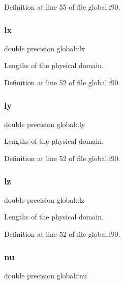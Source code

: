 Definition at line 55 of file global.\+f90.

\mbox{\label{namespaceglobal_ac5d2ea39fc192fbb8354e665dc91b759}} 
\subsubsection{\texorpdfstring{lx}{lx}}
{\footnotesize\ttfamily double precision global\+::lx}



Lengths of the physical domain. 



Definition at line 52 of file global.\+f90.

\mbox{\label{namespaceglobal_a6a6ee40bbab9e114aa217f7d8570b924}} 
\subsubsection{\texorpdfstring{ly}{ly}}
{\footnotesize\ttfamily double precision global\+::ly}



Lengths of the physical domain. 



Definition at line 52 of file global.\+f90.

\mbox{\label{namespaceglobal_a9d90050855b894304d8b4272c6a9ee71}} 
\subsubsection{\texorpdfstring{lz}{lz}}
{\footnotesize\ttfamily double precision global\+::lz}



Lengths of the physical domain. 



Definition at line 52 of file global.\+f90.

\mbox{\label{namespaceglobal_a48babc9c7f07053917ca1392e7a7b721}} 
\subsubsection{\texorpdfstring{nu}{nu}}
{\footnotesize\ttfamily double precision global\+::nu}



